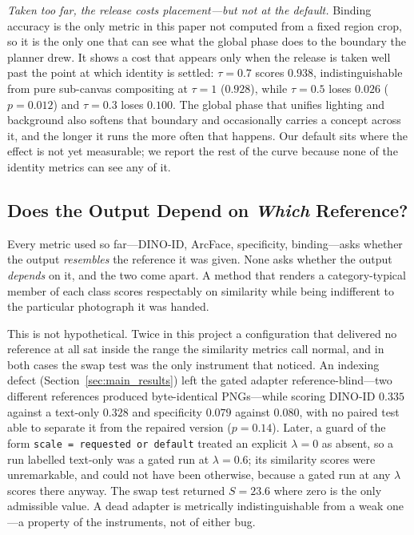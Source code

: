 \documentclass[10pt,twocolumn,letterpaper]{article}
\begin{document}
\noindent\textit{Taken too far, the release costs placement---but not at the
default.}
Binding accuracy is the only metric in this paper not computed from a fixed
region crop, so it is the only one that can see what the global phase does to
the boundary the planner drew.  It shows a cost that appears only when the
release is taken well past the point at which identity is settled:
$\tau{=}0.7$ scores $0.938$, indistinguishable from pure sub-canvas
compositing at $\tau{=}1$ ($0.928$), while $\tau{=}0.5$ loses $0.026$
($p{=}0.012$) and $\tau{=}0.3$ loses $0.100$.  The global phase that unifies
lighting and background also softens that boundary and occasionally carries a
concept across it, and the longer it runs the more often that happens.  Our
default sits where the effect is not yet measurable; we report the rest of
the curve because none of the identity metrics can see any of it.


\subsection{Does the Output Depend on \emph{Which} Reference?}
\label{sec:refresponse}

Every metric used so far---DINO-ID, ArcFace, specificity, binding---asks
whether the output \emph{resembles} the reference it was given.  None asks
whether the output \emph{depends} on it, and the two come apart.  A method
that renders a category-typical member of each class scores respectably on
similarity while being indifferent to the particular photograph it was
handed.

This is not hypothetical.  Twice in this project a configuration that
delivered no reference at all sat inside the range the similarity metrics
call normal, and in both cases the swap test was the only instrument that
noticed.  An indexing defect
(Section~\ref{sec:main_results}) left the gated adapter reference-blind---two
different references produced byte-identical PNGs---while scoring DINO-ID
$0.335$ against a text-only $0.328$ and specificity $0.079$ against $0.080$,
with no paired test able to separate it from the repaired version
($p{=}0.14$).  Later, a guard of the form \texttt{scale = requested or
default} treated an explicit $\lambda{=}0$ as absent, so a run labelled
text-only was a gated run at $\lambda{=}0.6$; its similarity scores were
unremarkable, and could not have been otherwise, because a gated run at any
$\lambda$ scores there anyway.  The swap test returned $S{=}23.6$ where zero
is the only admissible value.  A dead adapter is metrically indistinguishable
from a weak one---a property of the instruments, not of either bug.
\end{document}
